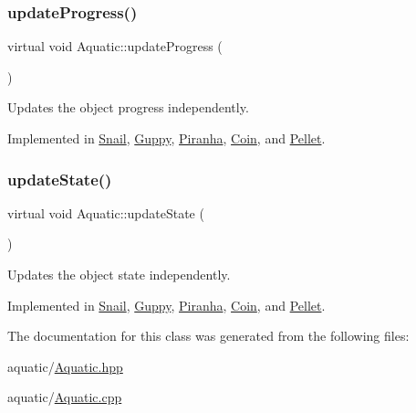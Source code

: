 \subsubsection{\texorpdfstring{update\+Progress()}{updateProgress()}}
{\footnotesize\ttfamily virtual void Aquatic\+::update\+Progress (\begin{DoxyParamCaption}{ }\end{DoxyParamCaption})\hspace{0.3cm}{\ttfamily [pure virtual]}}



Updates the object progress independently. 



Implemented in \mbox{\hyperlink{class_snail_a327c2d31017320c4cd18b48103905fa7}{Snail}}, \mbox{\hyperlink{class_guppy_af22eacc4a1ea7bec4be7b5d82148407b}{Guppy}}, \mbox{\hyperlink{class_piranha_ac4906080867655ef09591eba1cf2f00c}{Piranha}}, \mbox{\hyperlink{class_coin_ac54d7b690f7e415d2220711f718f638e}{Coin}}, and \mbox{\hyperlink{class_pellet_a1a7203cff52c771eb8cc62a91620e3ca}{Pellet}}.

\mbox{\label{class_aquatic_a51e44c95476d72a841fea667c6cbbedc}} 
\subsubsection{\texorpdfstring{update\+State()}{updateState()}}
{\footnotesize\ttfamily virtual void Aquatic\+::update\+State (\begin{DoxyParamCaption}{ }\end{DoxyParamCaption})\hspace{0.3cm}{\ttfamily [pure virtual]}}



Updates the object state independently. 



Implemented in \mbox{\hyperlink{class_snail_a46dbefb10308c29341d96423e853cb2b}{Snail}}, \mbox{\hyperlink{class_guppy_ac62ef7053d40430ad98c1d5a54699f9d}{Guppy}}, \mbox{\hyperlink{class_piranha_a851c302af9de1d6eaf727242e2912f62}{Piranha}}, \mbox{\hyperlink{class_coin_ac9d03cbd68f9ccb739895832f77d60a3}{Coin}}, and \mbox{\hyperlink{class_pellet_ab21f88899eba022e1693d911eba9dbfb}{Pellet}}.



The documentation for this class was generated from the following files\+:\begin{DoxyCompactItemize}
\item 
aquatic/\mbox{\hyperlink{_aquatic_8hpp}{Aquatic.\+hpp}}\item 
aquatic/\mbox{\hyperlink{_aquatic_8cpp}{Aquatic.\+cpp}}\end{DoxyCompactItemize}
